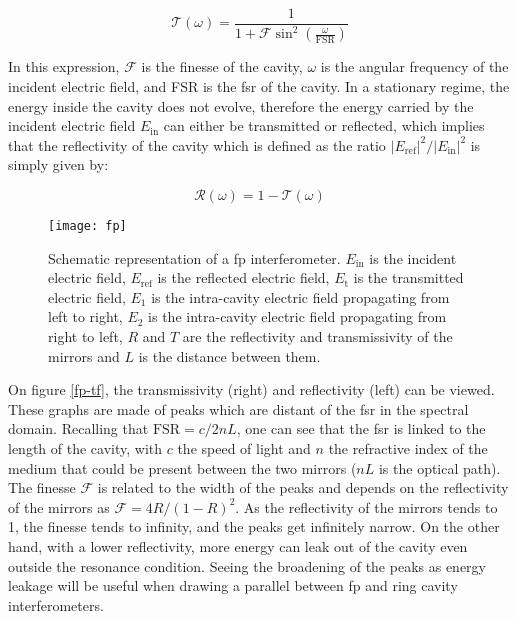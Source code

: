 \begin{equation}
	\mathcal{T}(\omega) = \frac{1}{1+\mathcal{F}\sin^2{\left(\frac{\omega}{\text{FSR}}\right)}}
	\label{transmissivity}
\end{equation}

In this expression, $\mathcal{F}$ is the finesse of the cavity, $\omega$ is the angular frequency of the incident electric field, and FSR is the \acrlong{fsr} of the cavity. In a stationary regime, the energy inside the cavity does not evolve, therefore the energy carried by the incident electric field $E_{\text{in}}$ can either be transmitted or reflected, which implies that the reflectivity of the cavity which is defined as the ratio $|E_{\text{ref}}|^2/|E_{\text{in}}|^2$ is simply given by:

\begin{equation}
	\mathcal{R}(\omega) = 1 - \mathcal{T}(\omega)
	\label{reflectivity}
\end{equation}

\begin{figure}[h]
	\centering
	\texttt{[image: fp]}
	\caption{Schematic representation of a \acrlong{fp} interferometer. $E_{\text{in}}$ is the incident electric field, $E_{\text{ref}}$ is the reflected electric field, $E_{\text{t}}$ is the transmitted electric field, $E_{1}$ is the intra-cavity electric field propagating from left to right, $E_{2}$ is the intra-cavity electric field propagating from right to left, $R$ and $T$ are the reflectivity and transmissivity of the mirrors and $L$ is the distance between them.}
	\label{fp}
\end{figure}

On figure \ref{fp-tf}, the transmissivity (right) and reflectivity (left) can be viewed. These graphs are made of peaks which are distant of the \gls{fsr} in the spectral domain. Recalling that $\text{FSR} = c/2nL$, one can see that the \gls{fsr} is linked to the length of the cavity, with $c$ the speed of light and $n$ the refractive index of the medium that could be present between the two mirrors ($nL$ is the optical path). The finesse $\mathcal{F}$ is related to the width of the peaks and depends on the reflectivity of the mirrors as $\mathcal{F} = 4R/(1-R)^2$. As the reflectivity of the mirrors tends to 1, the finesse tends to infinity, and the peaks get infinitely narrow. On the other hand, with a lower reflectivity, more energy can leak out of the cavity even outside the resonance condition. Seeing the broadening of the peaks as energy leakage will be useful when drawing a parallel between \gls{fp} and ring cavity interferometers.

